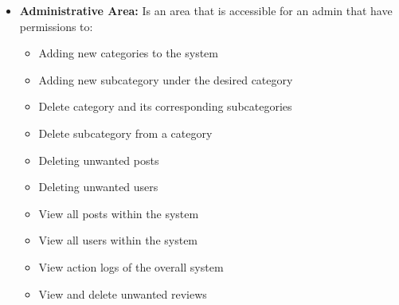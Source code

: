 \begin{itemize}
\begin{itemize}
        \end{itemize}
        \item \textbf{Administrative Area:} Is an area that is accessible for an admin that have permissions to:
        \begin{itemize}
            \item Adding new categories to the system
            \item Adding new subcategory under the desired category
            \item Delete category and its corresponding subcategories
            \item Delete subcategory from a category
            \item Deleting unwanted posts
            \item Deleting unwanted users
            \item View all posts within the system
            \item View all users within the system
            \item View action logs of the overall system
            \item View and delete unwanted reviews
        \end{itemize}
    \end{itemize}


